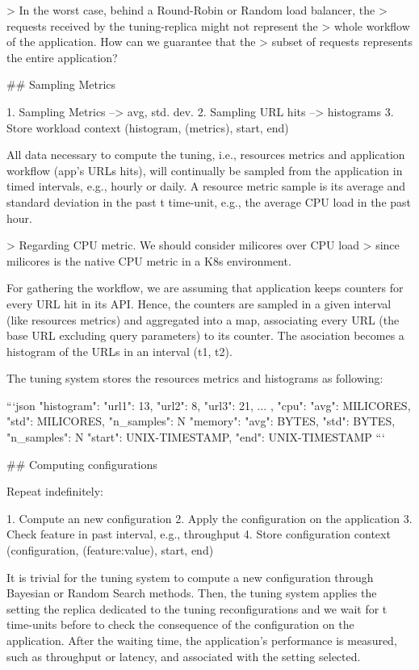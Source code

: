 > In the worst case, behind a Round-Robin or Random load balancer, the
> requests received by the tuning-replica might not represent the
> whole workflow of the application. How can we guarantee that the
> subset of requests represents the entire application?

## Sampling Metrics

1. Sampling Metrics --> avg, std. dev.
2. Sampling URL hits --> histograms
3. Store workload context (histogram, (metrics), start, end)

All data necessary to compute the tuning, i.e., resources metrics and
application workflow (app's URLs hits), will continually be sampled
from the application in timed intervals, e.g., hourly or daily. A
resource metric sample is its average and standard deviation in the
past t time-unit, e.g., the average CPU load in the past hour.

> Regarding CPU metric. We should consider milicores over CPU load
> since milicores is the native CPU metric in a K8s environment.

For gathering the workflow, we are assuming that application keeps
counters for every URL hit in its API. Hence, the counters are sampled
in a given interval (like resources metrics) and aggregated into a
map, associating every URL (the base URL excluding query parameters)
to its counter. The asociation becomes a histogram of the URLs in an
interval (t1, t2).

The tuning system stores the resources metrics and histograms as
following:

```json
{
  "histogram": {
    "url1": 13,
    "url2": 8,
    "url3": 21,
		...
	},
	"cpu": {"avg": MILICORES, "std": MILICORES, "n_samples": N}
	"memory": {"avg": BYTES, "std": BYTES, "n_samples": N}
	"start": UNIX-TIMESTAMP,
	"end": UNIX-TIMESTAMP
}
```

## Computing configurations

Repeat indefinitely:

1. Compute an new configuration
2. Apply the configuration on the application
3. Check feature in past interval, e.g., throughput
4. Store configuration context (configuration, (feature:value), start, end)

It is trivial for the tuning system to compute a new configuration
through Bayesian or Random Search methods. Then, the tuning system
applies the setting the replica dedicated to the tuning
reconfigurations and we wait for t time-units before to check the
consequence of the configuration on the application. After the waiting
time, the application's performance is measured, such as throughput or
latency, and associated with the setting selected.

